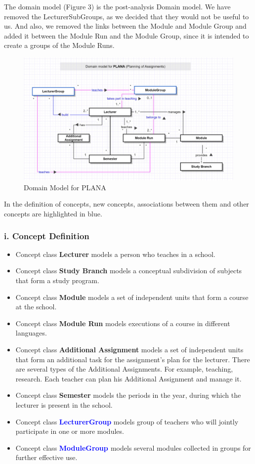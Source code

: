 \documentclass{scrartcl}
\begin{document}
The domain model (Figure 3) is the post-analysis Domain model. We have removed the LecturerSubGroups, as we decided that they would not be useful to us. And also, we removed the links between the Module and Module Group and added it between the Module Run and the Module Group, since it is intended to create a groups of the Module Runs.
\begin{figure}[H]
\centering
\includegraphics[width=150mm]{uml/domain-b3.JPG}
\caption{Domain Model for PLANA}
\label{blabla}
\end{figure}

In the definition of concepts, new concepts, associations between them and other concepts are highlighted in blue.

	    \subsubsection{i. Concept Definition}
	    
	    \begin{itemize}
	    \item Concept class \textbf{Lecturer} models a person who teaches in a school.
	     \item Concept class \textbf{Study Branch} models a conceptual subdivision of subjects that form a study program.
	      \item Concept class \textbf{Module} models a set of independent units that form a course at the school.
	       \item Concept class \textbf{Module Run } models executions of a course in different languages.
	       	      \item Concept class \textbf{Additional Assignment} models a set of independent units that form an additional task for the assignment's plan for the lecturer. There are several types of the Additional Assignments. For example, teaching, research. Each teacher can plan his Additional Assignment and manage it. 
  \item Concept class \textbf{Semester} models the periods in the year, during which the lecturer is present in the school.
  \item Concept class \textbf{\textcolor{blue}{ LecturerGroup}} models   group of teachers who will jointly participate in one or more modules.
   \item Concept class \textbf{\textcolor{blue}{ModuleGroup }}  models
   several modules collected in groups for further effective use.
   \end{itemize} 
   
\end{document}
